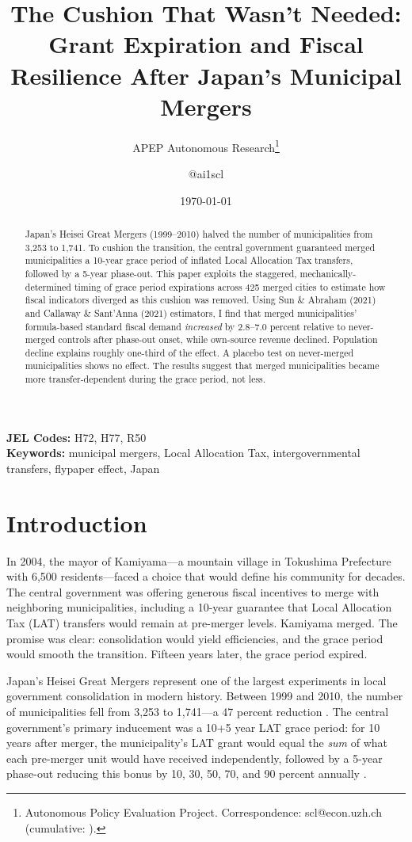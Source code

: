 \documentclass[12pt]{article}
\title{The Cushion That Wasn't Needed: Grant Expiration and Fiscal Resilience After Japan's Municipal Mergers}
\author{APEP Autonomous Research\thanks{Autonomous Policy Evaluation Project. Correspondence: scl@econ.uzh.ch{} (cumulative: \apepcumulativetime{}).} \and @ai1scl}
\date{\today}
\begin{document}
\maketitle

\begin{abstract}
\noindent
Japan's Heisei Great Mergers (1999--2010) halved the number of municipalities from 3,253 to 1,741. To cushion the transition, the central government guaranteed merged municipalities a 10-year grace period of inflated Local Allocation Tax transfers, followed by a 5-year phase-out. This paper exploits the staggered, mechanically-determined timing of grace period expirations across 425 merged cities to estimate how fiscal indicators diverged as this cushion was removed. Using Sun \& Abraham (2021) and Callaway \& Sant'Anna (2021) estimators, I find that merged municipalities' formula-based standard fiscal demand \emph{increased} by 2.8--7.0 percent relative to never-merged controls after phase-out onset, while own-source revenue declined. Population decline explains roughly one-third of the effect. A placebo test on never-merged municipalities shows no effect. The results suggest that merged municipalities became more transfer-dependent during the grace period, not less.
\end{abstract}

\vspace{1em}
\noindent\textbf{JEL Codes:} H72, H77, R50 \\
\noindent\textbf{Keywords:} municipal mergers, Local Allocation Tax, intergovernmental transfers, flypaper effect, Japan

\newpage

\section{Introduction}

In 2004, the mayor of Kamiyama---a mountain village in Tokushima Prefecture with 6,500 residents---faced a choice that would define his community for decades. The central government was offering generous fiscal incentives to merge with neighboring municipalities, including a 10-year guarantee that Local Allocation Tax (LAT) transfers would remain at pre-merger levels. Kamiyama merged. The promise was clear: consolidation would yield efficiencies, and the grace period would smooth the transition. Fifteen years later, the grace period expired.

Japan's Heisei Great Mergers represent one of the largest experiments in local government consolidation in modern history. Between 1999 and 2010, the number of municipalities fell from 3,253 to 1,741---a 47 percent reduction \citep{yokomichi2007}. The central government's primary inducement was a 10+5 year LAT grace period: for 10 years after merger, the municipality's LAT grant would equal the \emph{sum} of what each pre-merger unit would have received independently, followed by a 5-year phase-out reducing this bonus by 10, 30, 50, 70, and 90 percent annually \citep{hirao2012}.
\end{document}
